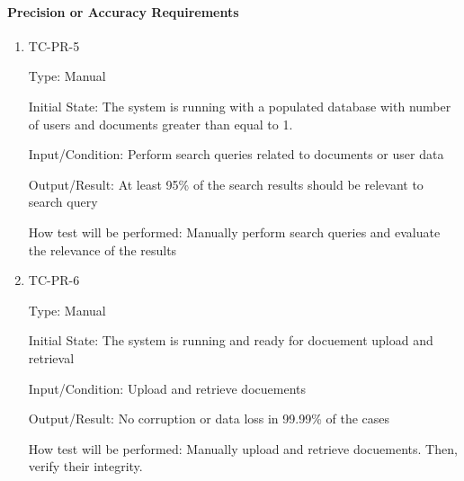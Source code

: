\documentclass[12pt, titlepage]{article}
\begin{document}
\paragraph{Precision or Accuracy Requirements}
\begin{enumerate}

  \item {TC-PR-5\\}

    Type: Manual

    Initial State: The system is running with a populated database with number
    of users and documents greater than equal to 1.

    Input/Condition: Perform search queries related to documents or user data

    Output/Result: At least 95\% of the search results should be relevant to
    search query

    How test will be performed: Manually perform search queries and evaluate the
    relevance of the results

  \item {TC-PR-6\\}

    Type: Manual

    Initial State: The system is running and ready for docuement upload and 
    retrieval

    Input/Condition: Upload and retrieve docuements

    Output/Result: No corruption or data loss in 99.99\% of the cases

    How test will be performed: Manually upload and retrieve docuements. Then,
    verify their integrity.

\end{enumerate}
\end{document}

